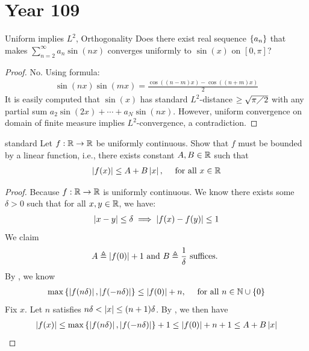 \documentclass{report}
\begin{document}
\section{Year 109}
\begin{question}{Uniform implies $L^2$, Orthogonality}{}
Does there exist real sequence $\left\{ a_n \right\}$ that makes $\sum_{n=2}^{\infty}a_n \sin (nx)$ converges uniformly to $\sin (x)$ on $[0,\pi ]$? 
\end{question}
\begin{proof}
No. Using formula:
\begin{align*}
 \sin (nx) \sin (mx) = \frac{\cos ((n-m)x) - \cos ((n+m)x)}{2}
\end{align*}
It is easily computed that $\sin (x)$ has standard $L^2$-distance $\geq \sqrt{\pi \diagup 2}  $ with any partial sum $a_2 \sin (2x)+\cdots + a_N \sin (nx)$. However, uniform convergence on domain of finite measure implies $L^2$-convergence, a contradiction.  
\end{proof}
\begin{question}{standard}{}
Let $f:\mathbb{R}\rightarrow \mathbb{R}$ be uniformly continuous. Show that $f$ must be bounded by a linear function, i.e., there exists constant $A,B \in\mathbb{R}$ such that 
\begin{align*}
\left|f(x)\right|\leq A+ B\left|x\right|,\quad \text{ for all }x\in\mathbb{R}
\end{align*}
\end{question}
\begin{proof}
Because $f:\mathbb{R} \rightarrow \mathbb{R}$ is uniformly continuous. We know there exists some $\delta >0$ such that for all $x,y\in\mathbb{R}$, we have: 
\begin{align}
\label{EQabxy}
\left|x-y\right|\leq \delta \implies  \left|f(x)-f(y)\right|\leq 1 
\end{align}
We claim 
 \begin{align*}
A\triangleq \left|f(0)\right|+1 \text{ and }B\triangleq \frac{1}{\delta}\text{ suffices. }
\end{align*}
By , we know 
\begin{align*}
\max \left\{ \left|f(n\delta)\right|,\left|f(-n\delta)\right| \right\} \leq \left|f(0)\right|+ n ,\quad \text{ for all }n\in\mathbb{N} \cup  \left\{ 0 \right\}
\end{align*}
Fix $x$. Let  $n$ satisfies $n\delta < \left|x\right| \leq (n+1)\delta$. By , we then have 
\begin{align*}
\left|f(x)\right|\leq \max \left\{ \left|f(n\delta)\right|,\left|f(-n\delta)\right| \right\} + 1 \leq \left|f(0)\right|+ n+1 \leq A + B\left|x\right|
\end{align*}

\end{proof}
\end{document}
